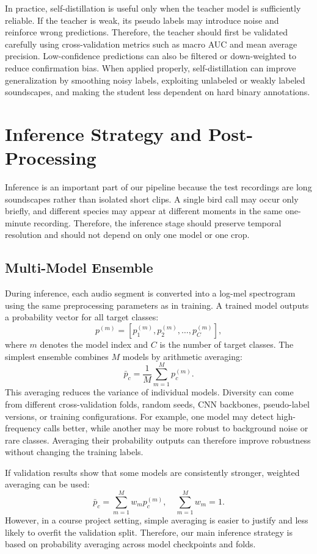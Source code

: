 \documentclass[a4paper,12pt]{article}
\begin{document}
In practice, self-distillation is useful only when the teacher model is sufficiently reliable. If the teacher is weak, its pseudo labels may introduce noise and reinforce wrong predictions. Therefore, the teacher should first be validated carefully using cross-validation metrics such as macro AUC and mean average precision. Low-confidence predictions can also be filtered or down-weighted to reduce confirmation bias. When applied properly, self-distillation can improve generalization by smoothing noisy labels, exploiting unlabeled or weakly labeled soundscapes, and making the student less dependent on hard binary annotations.


\section{Inference Strategy and Post-Processing}
Inference is an important part of our pipeline because the test recordings are long soundscapes rather than isolated short clips. A single bird call may occur only briefly, and different species may appear at different moments in the same one-minute recording. Therefore, the inference stage should preserve temporal resolution and should not depend on only one model or one crop.

\subsection{Multi-Model Ensemble}
During inference, each audio segment is converted into a log-mel spectrogram using the same preprocessing parameters as in training. A trained model outputs a probability vector for all target classes:
\[
p^{(m)} = [p^{(m)}_1,p^{(m)}_2,\ldots,p^{(m)}_C],
\]
where $m$ denotes the model index and $C$ is the number of target classes. The simplest ensemble combines $M$ models by arithmetic averaging:
\[
\bar{p}_c = \frac{1}{M}\sum_{m=1}^{M} p^{(m)}_c.
\]
This averaging reduces the variance of individual models. Diversity can come from different cross-validation folds, random seeds, CNN backbones, pseudo-label versions, or training configurations. For example, one model may detect high-frequency calls better, while another may be more robust to background noise or rare classes. Averaging their probability outputs can therefore improve robustness without changing the training labels.

If validation results show that some models are consistently stronger, weighted averaging can be used:
\[
\bar{p}_c = \sum_{m=1}^{M} w_m p^{(m)}_c, \quad \sum_{m=1}^{M} w_m=1.
\]
However, in a course project setting, simple averaging is easier to justify and less likely to overfit the validation split. Therefore, our main inference strategy is based on probability averaging across model checkpoints and folds.
\end{document}
